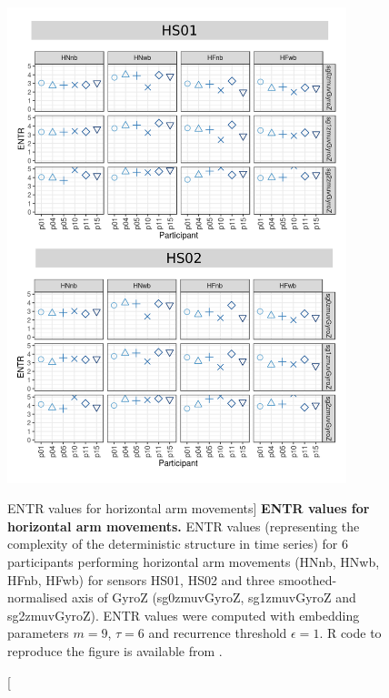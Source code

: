 \begin{figure}
\centering
\includegraphics[width=0.88\textwidth]{rqa_entr_H_w500}
    \caption
	[ENTR values for horizontal arm movements]{
	{\bf ENTR values for horizontal arm movements.}
	ENTR values (representing the complexity of the deterministic 
	structure in time series) for 
	6 participants performing horizontal arm movements 
	(HNnb, HNwb, HFnb, HFwb)
	for sensors HS01, HS02 and three smoothed-normalised axis 
	of GyroZ (sg0zmuvGyroZ, sg1zmuvGyroZ and sg2zmuvGyroZ).
	ENTR values were computed with 
	embedding parameters $m=9$, $\tau=6$ and recurrence threshold
	$\epsilon=1$.
	R code to reproduce the figure is available from \cite{xochicale2018}.
        }
    \label{fig:rqa_entr_H}
\end{figure}

